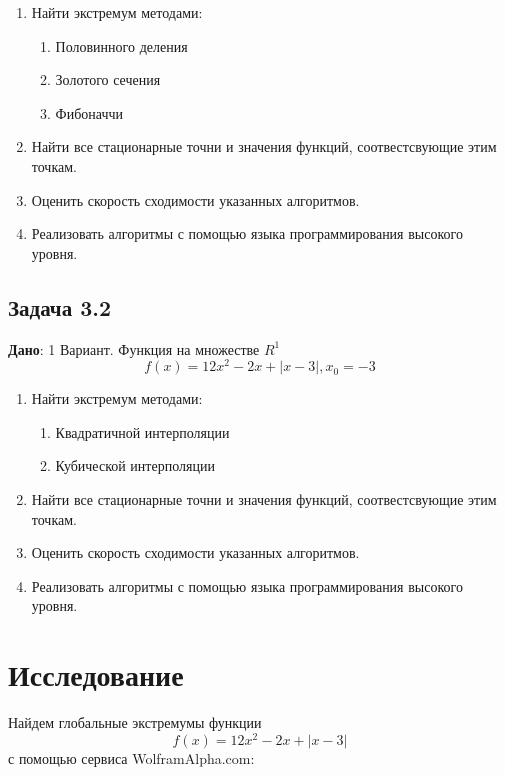 \documentclass[a4paper, 12pt]{article}   	%
\begin{document}
    \begin{enumerate}
        \item Найти экстремум методами:
        \begin{enumerate}
            \item Половинного деления
            \item Золотого сечения
            \item Фибоначчи
        \end{enumerate}
        \item Найти все стационарные точни и значения функций, соотвестсвующие этим точкам. 
        \item Оценить скорость сходимости указанных алгоритмов.
        \item Реализовать алгоритмы с помощью языка программирования высокого уровня.
    \end{enumerate}
    
    
\subsection{Задача 3.2}
    \textbf {Дано}: 1 Вариант. Функция на множестве $R^1$
    \begin{equation}
        f(x) = 12x^2-2x+ |x-3|, x_0 = -3
    \end{equation}
    
    \begin{enumerate}
        \item Найти экстремум методами:
        \begin{enumerate}
            \item Квадратичной интерполяции
            \item Кубической интерполяции
        \end{enumerate}
        \item Найти все стационарные точни и значения функций, соотвестсвующие этим точкам. 
        \item Оценить скорость сходимости указанных алгоритмов.
        \item Реализовать алгоритмы с помощью языка программирования высокого уровня.
    \end{enumerate}

\newpage
\section{Исследование}
    Найдем глобальные экстремумы функции 
    \begin{equation}
        f(x) = 12x^2-2x+ |x-3|
    \end{equation}
    с помощью сервиса WolframAlpha.com:
    
\end{document}

